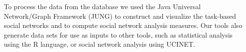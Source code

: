 \documentclass[12pt,oneside]{book}
\newcommand{\people}{project member}
\newcommand{\jazztm}{Jazz}
\begin{document}

To process the data from the database we used the Java Universal Network/Graph
Framework (JUNG) to construct and visualize the task-based social networks and to
compute social network analysis measures. Our tools also generate data sets for
use as inputs to other tools, such as statistical analysis using the R language,
or social network analysis using UCINET.



\end{document}

